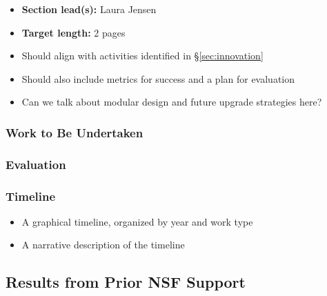 \documentclass[10pt]{myNSF}
\begin{document}
\begin{itemize}
\item{\textbf{Section lead(s):} Laura Jensen}
\item{\textbf{Target length:} 2 pages}
\item{Should align with activities identified in
    \S\ref{sec:innovation}}
\item{Should also include metrics for success and a plan for evaluation}
\item{Can we talk about modular design and future upgrade strategies
  here?}
\end{itemize}

\subsubsection{Work to Be Undertaken}
\label{sec:milestones}

\subsubsection{Evaluation}
\label{sec:evaluation}

\subsubsection{Timeline}
\label{sec:timeline}

\begin{itemize}
\item{A graphical timeline, organized by year and work type}
\item{A narrative description of the timeline}
\end{itemize}

\subsection{Results from Prior NSF Support}
\label{sec:prior_support}
\end{document}
